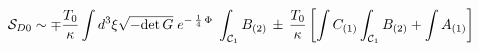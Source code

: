 \begin{equation}
{\cal S}_{D0} \sim \mp \frac{T_0}{\kappa} \int d^3 \xi \sqrt{- {\rm
det}\, G}  \; e^{-\,\frac{1}{4}\,\Phi} \; \int_{{\cal C}_1} B_{(2)} \,
\pm \, \frac{T_0}{\kappa}  \left[ \int C_{(1)} \int_{{\cal C}_1}
B_{(2)} +  \int A_{(1)} \right]
\end{equation}

